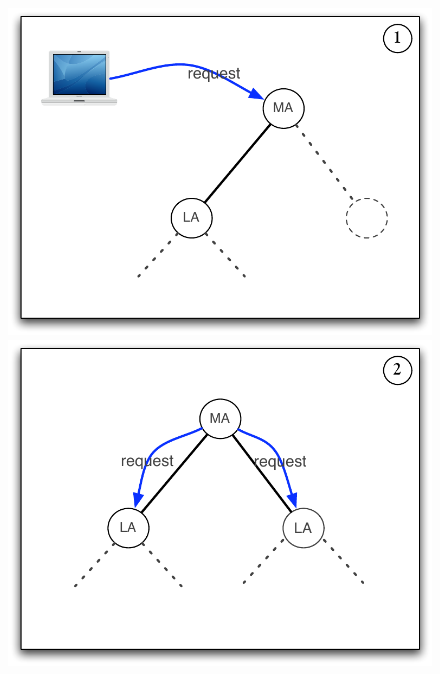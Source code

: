\begin{figure}[h]
  \centering
  \begin{minipage}{\schdlFigWidth}
    \includegraphics[width=\schdlFigWidth]{fig/schdl00}
  \end{minipage}
  \begin{minipage}{\schdlFigWidth}
    \includegraphics[width=\schdlFigWidth]{fig/schdl01}
  \end{minipage}
  \begin{minipage}{\schdlFigWidth}

\end{minipage}
\end{figure}
